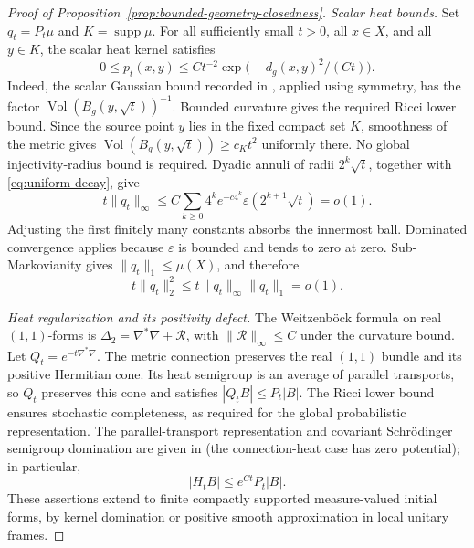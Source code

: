 \documentclass[11pt]{article}
\theoremstyle{remark}
\newcommand{\supp}{\operatorname{supp}}
\begin{document}
\begin{proof}[Proof of Proposition~\ref{prop:bounded-geometry-closedness}]
\medskip\noindent
\emph{Scalar heat bounds.}
Set $q_t=P_t\mu$ and $K=\supp\mu$. For all sufficiently small $t>0$,
all $x\in X$, and all $y\in K$, the scalar heat kernel satisfies
\begin{equation}\label{eq:Gaussian}
 0\leq p_t(x,y)\leq C t^{-2}
       \exp\bigl(-d_g(x,y)^2/(Ct)\bigr).
\end{equation}
Indeed, the scalar Gaussian bound recorded in
\cite[Introduction, before Proposition~1.1]{BDG}, applied using
symmetry, has the factor $\operatorname{Vol}(B_g(y,\sqrt t))^{-1}$.
Bounded curvature gives the required Ricci lower bound. Since the
source point $y$ lies in the fixed compact set $K$, smoothness of
the metric gives $\operatorname{Vol}(B_g(y,\sqrt t))\ge c_Kt^2$
uniformly there. No global injectivity-radius bound is required.
Dyadic annuli of
radii $2^k\sqrt t$, together with \eqref{eq:uniform-decay}, give
\[
 t\|q_t\|_\infty
 \leq C\sum_{k\geq0}4^k e^{-c4^k}
                  \varepsilon(2^{k+1}\sqrt t)=o(1).
\]
Adjusting the first finitely many constants absorbs the innermost
ball. Dominated convergence applies because $\varepsilon$ is bounded
and tends to zero at zero. Sub-Markovianity gives
$\|q_t\|_1\leq\mu(X)$, and therefore
\begin{equation}\label{eq:heat-L2}
 t\|q_t\|_2^2
 \leq t\|q_t\|_\infty\|q_t\|_1=o(1).
\end{equation}

\medskip\noindent
\emph{Heat regularization and its positivity defect.}
The Weitzenb\"ock formula on real $(1,1)$-forms is
$\Delta_2=\nabla^*\nabla+\mathcal R$, with
$\|\mathcal R\|_\infty\leq C$ under the curvature bound.
Let $Q_t=e^{-t\nabla^*\nabla}$. The metric connection preserves
the real $(1,1)$ bundle and its positive Hermitian cone. Its heat
semigroup is an average of parallel transports, so $Q_t$ preserves
this cone and satisfies $|Q_t B|\leq P_t|B|$.
The Ricci lower bound ensures stochastic completeness, as required
for the global probabilistic representation.
The parallel-transport representation and covariant Schr\"odinger
semigroup domination are given in \cite[Lemmas~3.6--3.7]{BDG}
(the connection-heat case has zero potential); in particular,
\[
 |H_t B|\leq e^{Ct}P_t|B|.
\]
These assertions extend to finite compactly supported
measure-valued initial forms, by kernel domination or positive
smooth approximation in local unitary frames.


\end{proof}
\end{document}

